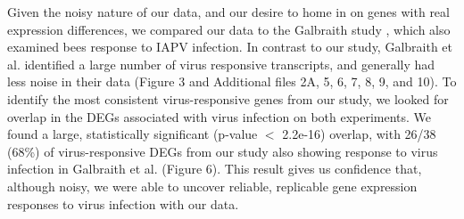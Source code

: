 \documentclass{bmcart}
\begin{document}
\begin{linenumbers}
\begin{doublespacing}
Given the noisy nature of our data, and our desire to home in on genes with real expression differences, we compared our data to the Galbraith study \cite{galbraith}, which also examined bees response to IAPV infection. In contrast to our study, Galbraith et al. identified a large number of virus responsive transcripts, and generally had less noise in their data (Figure 3 and Additional files 2A, 5, 6, 7, 8, 9, and 10). To identify the most consistent virus-responsive genes from our study, we looked for overlap in the DEGs associated with virus infection on both experiments. We found a large, statistically significant (p-value $<$ 2.2e-16) overlap, with 26/38 (68\%) of virus-responsive DEGs from our study also showing response to virus infection in Galbraith et al. (Figure 6). This result gives us confidence that, although noisy, we were able to uncover reliable, replicable gene expression responses to virus infection with our data.


\end{doublespacing}
\end{linenumbers}
\end{document}
